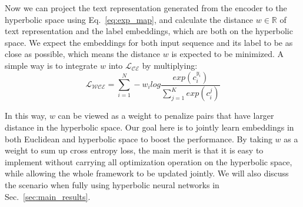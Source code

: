 Now we can project the text representation generated from the encoder to the hyperbolic space using Eq.~\ref{eq:exp_map}, and calculate the distance $w \in \mathbb{R}$ of text representation and the label embeddings, which are both on the hyperbolic space.
We expect the embeddings for both input sequence and its label to be as close as possible, which means the distance $w$ is expected to be minimized. A simple way is to integrate $w$ into $\mathcal{L}_\mathcal{CE}$ by multiplying: 
\begin{equation}
    \mathcal{L}_\mathcal{WCE} =  \sum_{i = 1}^N-w_i log \frac{exp(c_i^{y_i})}{\sum_{j = 1}^K exp(c_i^j)}
\end{equation}

In this way, $w$ can be viewed as a weight to penalize pairs that have larger distance in the hyperbolic space. Our goal here is to jointly learn embeddings in both Euclidean and hyperbolic space to boost the performance. By taking $w$ as a weight to sum up cross entropy loss, the main merit is that it is easy to implement without carrying all optimization operation on the hyperbolic space, while allowing the whole framework to be updated jointly. We will also discuss the scenario when fully using hyperbolic neural networks in Sec.~\ref{sec:main_results}.
